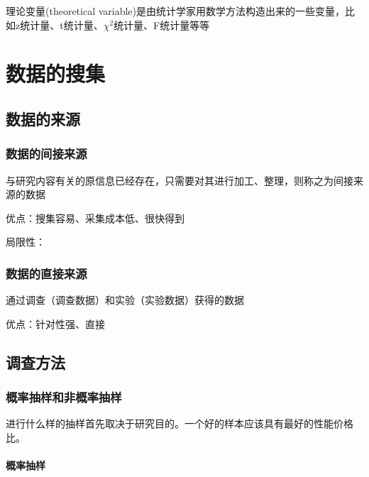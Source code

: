 \documentclass[UTF8,10pt]{book}
\begin{document}
    理论变量(theoretical variable)是由统计学家用数学方法构造出来的一些变量，比如z统计量、t统计量、$\chi^2$统计量、F统计量等等

\clearpage
\chapter{数据的搜集}




    \section{数据的来源}
    \subsection{数据的间接来源}

    与研究内容有关的原信息已经存在，只需要对其进行加工、整理，则称之为间接来源的数据

    优点：搜集容易、采集成本低、很快得到

    局限性：

    \subsection{数据的直接来源}

    通过调查（调查数据）和实验（实验数据）获得的数据
    
    优点：针对性强、直接

    \section{调查方法}

    \subsection{概率抽样和非概率抽样}

    进行什么样的抽样首先取决于研究目的。一个好的样本应该具有最好的性能价格比。

    \subsubsection{概率抽样}
\end{document}
